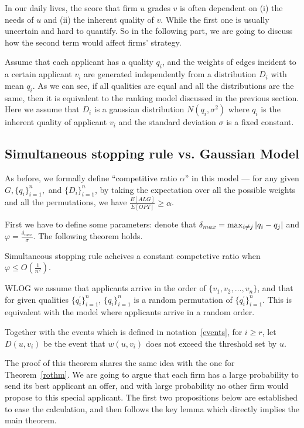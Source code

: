 In our daily lives, the score that firm $u$ grades $v$ is often dependent
on (i) the needs of $u$ and (ii) the inherent quality of $v$.
While the first one is usually uncertain and
hard to quantify. So in the following part,
we are going to discuss how the second term would affect firms' strategy.

Assume that each applicant has a quality $q_i$, and the weights of edges
incident to a certain applicant $v_i$ are generated independently from
a distribution $D_i$ with mean $q_i$.
As we can see, if all qualities are equal and all the distributions
are the same, then it is equivalent to the ranking model
discussed in the previous section.
Here we assume that $D_i$ is a gaussian distribution $N(q_i, \sigma^2)$
where $q_i$ is the inherent quality of applicant $v_i$ and the
standard deviation $\sigma$ is a fixed constant.

\subsection{Simultaneous stopping rule vs. Gaussian Model}\label{gaussian1}

As before, we formally define ``competitive ratio $\alpha$'' in this model --- for any given $G, \{q_i\}_{i=1}^n,$ and $\{D_i\}_{i=1}^n$, by taking the expectation over all the possible weights and all the permutations, we have $\frac{E[ALG]}{E[OPT]} \ge \alpha$.

First we have to define some parameters:
denote that $\delta_{max} = \max_{i \neq j} \left\vert q_i - q_j\right\vert$ and
$\varphi = \frac{\delta_{max}}{\sigma}$. The following theorem holds.

\begin{theorem}\label{normalthm}
    Simultaneous stopping rule acheives a constant competetive ratio
    when $\varphi \le O(\frac{1}{n^2})$.
\end{theorem}

WLOG we assume that applicants arrive in the order of $\{v_1, v_2, \dots, v_n\}$,
and that for given qualities $\{q_i^\prime\}_{i=1}^n$, $\{q_i\}_{i=1}^n$ is a random permutation of $\{q_i^\prime\}_{i=1}^n$.
This is equivalent with the model where applicants arrive in a random order.

Together with the events which is defined in notation~\ref{events},
for $i \ge r$, let $D(u, v_i)$ be the event that $w(u, v_i)$
does not exceed the threshold set by $u$.

The proof of this theorem shares the same idea with the
one for Theorem~\ref{rothm}. We are going to argue that each firm has a large probability
to send its best applicant an offer, and with large probability no other
firm would propose to this special applicant.
The first two propositions below are established to ease the calculation,
and then follows the key lemma which directly implies the main theorem.

